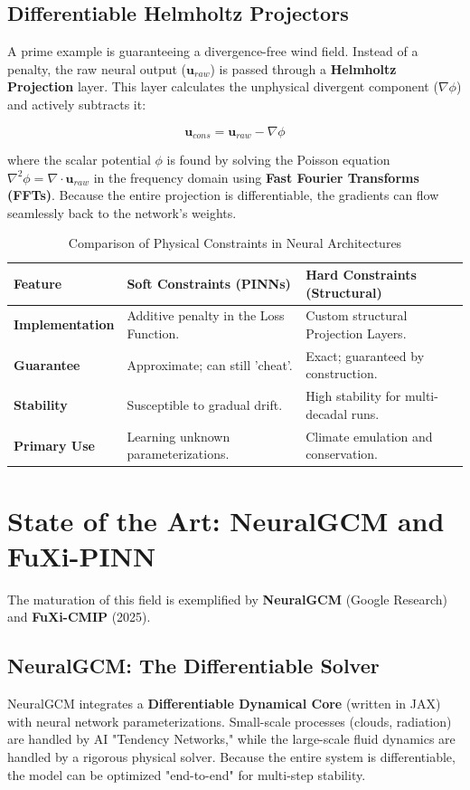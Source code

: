 \subsection{Differentiable Helmholtz Projectors}
A prime example is guaranteeing a divergence-free wind field. Instead of a penalty, the raw neural output ($\mathbf{u}_{raw}$) is passed through a \textbf{Helmholtz Projection} layer. This layer calculates the unphysical divergent component ($\nabla \phi$) and actively subtracts it:

\begin{equation}
\mathbf{u}_{cons} = \mathbf{u}_{raw} - \nabla \phi
\end{equation}

where the scalar potential $\phi$ is found by solving the Poisson equation $\nabla^2 \phi = \nabla \cdot \mathbf{u}_{raw}$ in the frequency domain using \textbf{Fast Fourier Transforms (FFTs)}. Because the entire projection is differentiable, the gradients can flow seamlessly back to the network's weights.

\begin{table}[H]
\centering
\caption{Comparison of Physical Constraints in Neural Architectures}
\begin{tabular}{|l|p{6cm}|p{6cm}|}
\hline
\textbf{Feature} & \textbf{Soft Constraints (PINNs)} & \textbf{Hard Constraints (Structural)} \\ \hline
\textbf{Implementation} & Additive penalty in the Loss Function. & Custom structural Projection Layers. \\ \hline
\textbf{Guarantee} & Approximate; can still 'cheat'. & Exact; guaranteed by construction. \\ \hline
\textbf{Stability} & Susceptible to gradual drift. & High stability for multi-decadal runs. \\ \hline
\textbf{Primary Use} & Learning unknown parameterizations. & Climate emulation and conservation. \\ \hline
\end{tabular}
\end{table}

\section{State of the Art: NeuralGCM and FuXi-PINN}

The maturation of this field is exemplified by \textbf{NeuralGCM} (Google Research) and \textbf{FuXi-CMIP} (2025). 

\subsection{NeuralGCM: The Differentiable Solver}
NeuralGCM integrates a \textbf{Differentiable Dynamical Core} (written in JAX) with neural network parameterizations. Small-scale processes (clouds, radiation) are handled by AI "Tendency Networks," while the large-scale fluid dynamics are handled by a rigorous physical solver. Because the entire system is differentiable, the model can be optimized "end-to-end" for multi-step stability.

